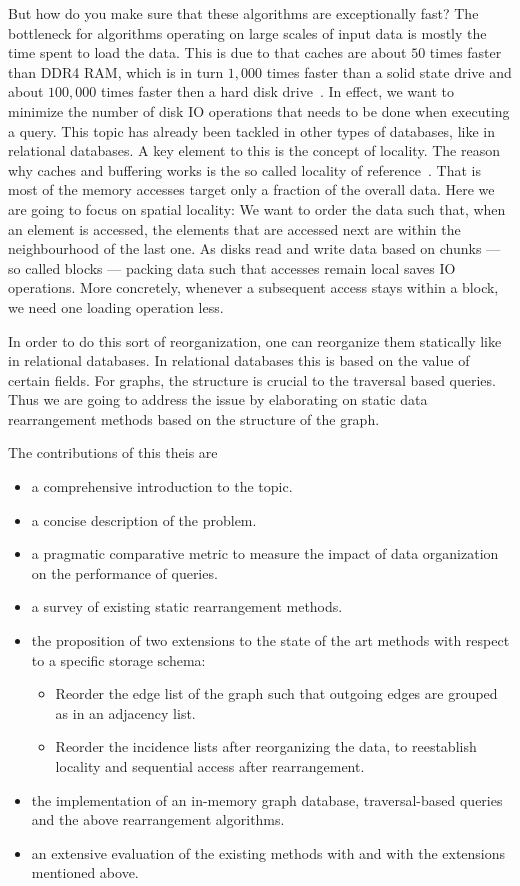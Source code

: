 But how do you make sure that these algorithms are exceptionally fast?
The bottleneck for algorithms operating on large scales of input data is mostly the time spent to load the data. 
This is due to that caches are about $50$ times faster than DDR4 RAM, which is in turn $1,000$ times faster than a solid state drive and about $100,000$ times faster then a hard disk drive~\autocite{mem-h}.
In effect, we want to minimize the number of disk IO operations that needs to be done when executing a query.
This topic has already been tackled in other types of databases, like in relational databases.
A key element to this is the concept of locality. 
The reason why caches and buffering works is the so called locality of reference~\autocite{tanenbaum2015modern, jacob2010memory}. 
That is most of the memory accesses target only a fraction of the overall data. 
Here we are going to focus on spatial locality: 
We want to order the data such that, when an element is accessed, the elements that are accessed next are within the neighbourhood of the last one. 
As disks read and write data based on chunks --- so called blocks --- packing data such that accesses remain local saves IO operations. More concretely, whenever a subsequent access stays within a block, we need one loading operation less.

In order to do this sort of reorganization, one can reorganize them statically like in relational databases. 
In relational databases this is based on the value of certain fields.
For graphs, the structure is crucial to the traversal based queries.
Thus we are going to address the issue by elaborating on static data rearrangement  methods based on the structure of the graph.

The contributions of this theis are 
\begin{itemize}
 \item a comprehensive introduction to the topic.
 \item a concise description of the problem.
 \item a pragmatic comparative metric to measure the impact of data organization on the performance of queries.
 \item a survey of existing static rearrangement methods.
 \item the proposition of two extensions to the state of the art methods with respect to a specific storage schema:
 \begin{itemize}
  \item Reorder the edge list of the graph such that outgoing edges are grouped as in an adjacency list.
  \item Reorder the incidence lists after reorganizing the data, to reestablish locality and sequential access after rearrangement.
 \end{itemize}

 \item the implementation of an in-memory graph database, traversal-based queries and the above rearrangement algorithms.
 \item an extensive evaluation of the existing methods with and with the extensions mentioned above.
\end{itemize}

